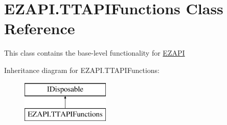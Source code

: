 \hypertarget{class_e_z_a_p_i_1_1_t_t_a_p_i_functions}{\section{E\-Z\-A\-P\-I.\-T\-T\-A\-P\-I\-Functions Class Reference}
\label{class_e_z_a_p_i_1_1_t_t_a_p_i_functions}
}


This class contains the base-\/level functionality for \hyperlink{namespace_e_z_a_p_i}{E\-Z\-A\-P\-I}  


Inheritance diagram for E\-Z\-A\-P\-I.\-T\-T\-A\-P\-I\-Functions\-:\begin{figure}[H]
\begin{center}
\leavevmode
\includegraphics[height=2.000000cm]{class_e_z_a_p_i_1_1_t_t_a_p_i_functions}
\end{center}
\end{figure}
